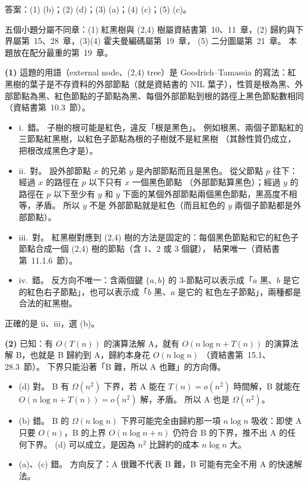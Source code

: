 \begin{pastsoln}
答案：(1) (b)；(2) (d)；(3) (a)；(4) (c)；(5) (c)。

五個小題分屬不同章：(1) 紅黑樹與 (2,4) 樹屬資結書第~10、11~章，(2) 歸約與下界屬第~15、28~章，(3)(4) 霍夫曼編碼屬第~19~章，
(5) 二分圖屬第~21~章。 本題放在配分最重的第~19~章。

\textbf{(1)} 這題的用語（external node、(2,4) tree）是 Goodrich--Tamassia 的寫法：紅黑樹的葉子是不存資料的外部節點（就是資結書的
NIL 葉子），性質是根為黑、外部節點為黑、紅色節點的子節點為黑、每個外部節點到根的路徑上黑色節點數相同（資結書第~10.3~節）。
\begin{itemize}
\item i.\ 錯。 子樹的根可能是紅色，違反「根是黑色」。 例如根黑、兩個子節點紅的三節點紅黑樹，以紅色子節點為根的子樹就不是紅黑樹
（其餘性質仍成立，把根改成黑色才是）。
\item ii.\ 對。 設外部節點 $x$ 的兄弟 $y$ 是內部節點而且是黑色。 從父節點 $p$ 往下：經過 $x$ 的路徑在 $p$ 以下只有 $x$ 一個黑色節點
（外部節點算黑色）；經過 $y$ 的路徑在 $p$ 以下至少有 $y$ 和 $y$ 下面的某個外部節點兩個黑色節點，黑高度不相等，矛盾。 所以 $y$ 不是
外部節點就是紅色（而且紅色的 $y$ 兩個子節點都是外部節點）。
\item iii.\ 對。 紅黑樹對應到 (2,4) 樹的方法是固定的：每個黑色節點和它的紅色子節點合成一個 (2,4) 樹的節點（含 $1$、$2$ 或 $3$ 個鍵），
結果唯一（資結書第~11.1.6~節）。
\item iv.\ 錯。 反方向不唯一：含兩個鍵 $\{a, b\}$ 的 3-節點可以表示成「$a$ 黑、$b$ 是它的紅色右子節點」，也可以表示成「$b$ 黑、$a$ 是它的
紅色左子節點」，兩種都是合法的紅黑樹。
\end{itemize}
正確的是 ii、iii，選 (b)。

\textbf{(2)} 已知：有 $O(T(n))$ 的演算法解 A，就有 $O(n \log n + T(n))$ 的演算法解 B，也就是 B 歸約到 A，歸約本身花 $O(n \log n)$
（資結書第~15.1、28.3~節）。 下界只能沿著「B 難，所以 A 也難」的方向傳。
\begin{itemize}
\item (d) 對。 B 有 $\Omega(n^2)$ 下界，若 A 能在 $T(n) = o(n^2)$ 時間解，B 就能在 $O(n \log n + T(n)) = o(n^2)$ 解，矛盾。 所以 A 也是
$\Omega(n^2)$。
\item (b) 錯。 B 的 $\Omega(n \log n)$ 下界可能完全由歸約那一項 $n \log n$ 吸收：即使 A 只要 $O(n)$，B 的上界 $O(n \log n + n)$ 仍符合
B 的下界，推不出 A 的任何下界。 (d) 可以成立，是因為 $n^2$ 比歸約的成本 $n \log n$ 大。
\item (a)、(c) 錯。 方向反了：A 很難不代表 B 難，B 可能有完全不用 A 的快速解法。
\end{itemize}


\end{pastsoln}
